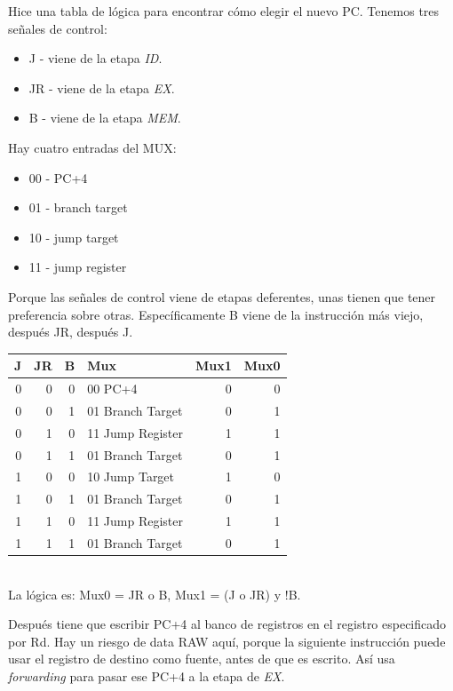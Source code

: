 \documentclass[a4paper]{article}
\begin{document}
Hice una tabla de lógica para encontrar cómo elegir el nuevo PC. Tenemos tres señales de control:
\begin{itemize}[noitemsep]
\item J - viene de la etapa \textit{ID}.
\item JR - viene de la etapa \textit{EX}.
\item B - viene de la etapa \textit{MEM}.
\end{itemize}

Hay cuatro entradas del MUX:
\begin{itemize}[noitemsep]
\item 00 - PC+4
\item 01 - branch target
\item 10 - jump target
\item 11 - jump register
\end{itemize}

Porque las señales de control viene de etapas deferentes, unas tienen que tener preferencia sobre otras. Específicamente B viene de la instrucción más viejo, después JR, después J.

\begin{tabular}{| r r r | l r r |}
\hline
J & JR & B      & Mux                 & Mux1    & Mux0 \\ \hline
0 & 0  & 0      & 00 PC+4             & 0       & 0    \\
0 & 0  & 1      & 01 Branch Target    & 0       & 1    \\
0 & 1  & 0      & 11 Jump Register    & 1       & 1    \\
0 & 1  & 1      & 01 Branch Target    & 0       & 1    \\
1 & 0  & 0      & 10 Jump Target      & 1       & 0    \\
1 & 0  & 1      & 01 Branch Target    & 0       & 1    \\
1 & 1  & 0      & 11 Jump Register    & 1       & 1    \\
1 & 1  & 1      & 01 Branch Target    & 0       & 1    \\ \hline
\end{tabular} \\

La lógica es: Mux0 = JR o B, Mux1 = (J o JR) y !B.

Después tiene que escribir PC+4 al banco de registros en el registro especificado por Rd. Hay un riesgo de data RAW aquí, porque la siguiente instrucción puede usar el registro de destino como fuente, antes de que es escrito. Así usa \textit{forwarding} para pasar ese PC+4 a la etapa de \textit{EX}.
\end{document}
